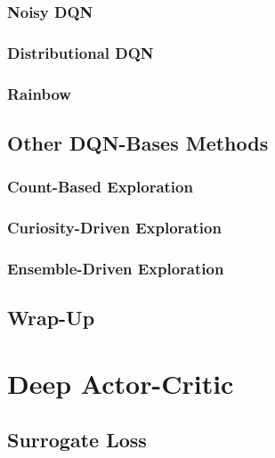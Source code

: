 		\subsection{Noisy DQN} %

		\subsection{Distributional DQN} %

		\subsection{Rainbow} %

	\section{Other DQN-Bases Methods} %

		\subsection{Count-Based Exploration} %

		\subsection{Curiosity-Driven Exploration} %

		\subsection{Ensemble-Driven Exploration} %

	\section{Wrap-Up} %

\chapter{Deep Actor-Critic} %

	\section{Surrogate Loss} %

